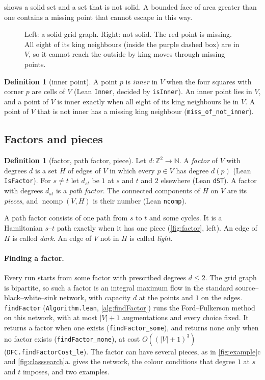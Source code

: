 \documentclass[11pt]{article}
\theoremstyle{plain}
\theoremstyle{definition}
\newtheorem{definition}[theorem]{Definition}
\theoremstyle{remark}
\newcommand{\Z}{\mathbb{Z}}
\newcommand{\lean}[1]{\texttt{#1}}
\newcommand{\ncomp}{\operatorname{ncomp}}
\begin{document}
 shows a solid set and a set that is not solid.
A bounded face of area greater than one contains a missing point that cannot escape in this way.

\begin{figure}[t]
\centering

\caption{Left: a solid grid graph.
Right: not solid.
The red point is missing.
All eight of its king neighbours (inside the purple dashed box) are in $V$, so it cannot reach the
outside by king moves through missing points.}
\label{fig:solid}
\end{figure}

\begin{definition}[inner point]
A point $p$ is \emph{inner} in $V$ when the four squares with corner $p$ are cells of $V$
(Lean \lean{Inner}, decided by \lean{isInner}).
An inner point lies in $V$, and a point of $V$ is inner exactly when all eight of its king
neighbours lie in $V$.
A point of $V$ that is not inner has a missing king neighbour (\lean{miss\_of\_not\_inner}).
\end{definition}

\subsection{Factors and pieces}

\begin{definition}[factor, path factor, piece]
Let $d\colon\Z^2\to\mathbb N$.
A \emph{factor} of $V$ with degrees $d$ is a set $H$ of edges of $V$ in which every $p\in V$ has
degree $d(p)$ (Lean \lean{IsFactor}).
For $s\neq t$ let $d_{st}$ be $1$ at $s$ and $t$ and $2$ elsewhere (Lean \lean{dST}).
A factor with degrees $d_{st}$ is a \emph{path factor}.
The connected components of $H$ on $V$ are its \emph{pieces}, and $\ncomp(V,H)$ is their number
(Lean \lean{ncomp}).
\end{definition}

A path factor consists of one path from $s$ to $t$ and some cycles.
It is a Hamiltonian $s$--$t$ path exactly when it has one piece (\cref{fig:factor}, left).
An edge of $H$ is called \emph{dark}.
An edge of $V$ not in $H$ is called \emph{light}.

\paragraph{Finding a factor.}
Every run starts from some factor with prescribed degrees $d\le2$.
The grid graph is bipartite, so such a factor is an integral maximum flow in the standard
source--black--white--sink network, with capacity $d$ at the points and $1$ on the edges.
\lean{findFactor} (\lean{Algorithm.lean}, \cref{alg:findFactor}) runs the Ford--Fulkerson method on
this network, with at most $|V|+1$ augmentations and every choice fixed.
It returns a factor when one exists (\lean{findFactor\_some}), and returns none only when no factor
exists (\lean{findFactor\_none}), at cost $O((|V|+1)^3)$ (\lean{DFC.findFactorCost\_le}).
The factor can have several pieces, as in \cref{fig:example}c and \cref{fig:classsearch}a.
 gives the network, the colour conditions that degree $1$ at $s$ and $t$ imposes,
and two examples.
\end{document}
